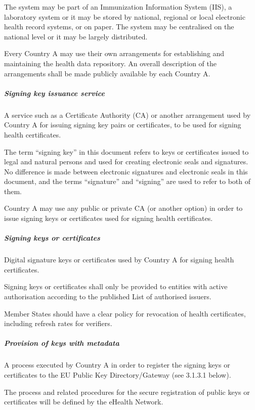 \documentclass[a4paper,12pt,english]{sphinxhowto}
\begin{document}
\sphinxAtStartPar
The system may be part of an Immunization Information System (IIS), a laboratory system or
it may be stored by national, regional or local electronic health record systems, or on
paper. The system may be centralised on the national level or it may be largely
distributed.

\sphinxAtStartPar
Every Country A may use their own arrangements for establishing and maintaining the health
data repository. An overall description of the arrangements shall be made publicly
available by each Country A.


\subparagraph{Signing key issuance service}
\label{\detokenize{ssi/annotehealth:signing-key-issuance-service}}
\sphinxAtStartPar
A service such as a Certificate Authority (CA) or another arrangement used by Country A for issuing signing key pairs or certificates, to be used for signing health certificates.

\sphinxAtStartPar
The term “signing key” in this document refers to keys or certificates issued to legal and natural persons and used for creating electronic seals and signatures. No difference is made between electronic signatures and electronic seals in this document, and the terms “signature” and “signing” are used to refer to both of them.

\sphinxAtStartPar
Country A may use any public or private CA (or another option) in order to issue signing keys or certificates used for signing health certificates.


\subparagraph{Signing keys or certificates}
\label{\detokenize{ssi/annotehealth:signing-keys-or-certificates}}
\sphinxAtStartPar
Digital signature keys or certificates used by Country A for signing health certificates.

\sphinxAtStartPar
Signing keys or certificates shall only be provided to entities with active authorisation according to the published List of authorised issuers.

\sphinxAtStartPar
Member States should have a clear policy for revocation of health certificates, including refresh rates for verifiers.


\subparagraph{Provision of keys with metadata}
\label{\detokenize{ssi/annotehealth:provision-of-keys-with-metadata}}
\sphinxAtStartPar
A process executed by Country A in order to register the signing keys or certificates to the EU Public Key Directory/Gateway (see 3.1.3.1 below).

\sphinxAtStartPar
The process and related procedures for the secure registration of public keys or certificates will be defined by the eHealth Network.
\end{document}
